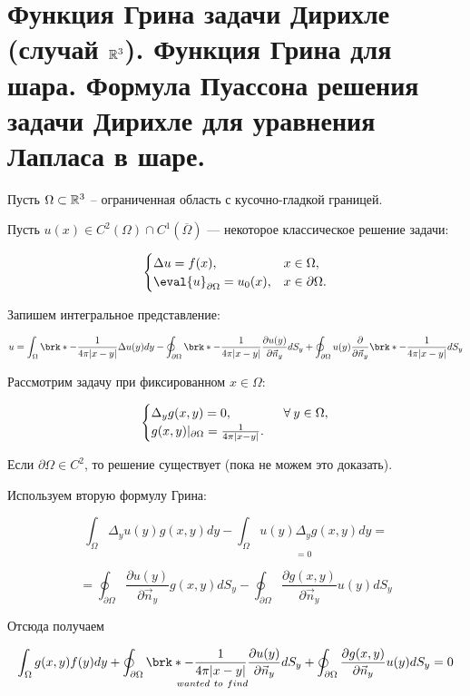 \section{Функция Грина задачи Дирихле (случай $\mathbb{R}^3$). Функция Грина для шара. Формула Пуассона решения задачи Дирихле для уравнения Лапласа в шаре.}

Пусть $\Omega \subset \mathbb{R}^3$ -- ограниченная область с кусочно-гладкой границей.

Пусть $u(x) \in C^2(\Omega) \cap C^1(\overline{\Omega})$ --- некоторое классическое решение задачи:

\[\begin{cases}
   \Delta u = f(x), & x\in \Omega, \\
   \eval{u}_{\partial \Omega} = u_0(x), & x \in \partial \Omega. 
\end{cases}\]  

Запишем интегральное представление:

$$ u = \int_{\Omega}{\brk*{-\frac{1}{4 \pi |x-y|}}  {\Delta u(y)} dy} - \oint_{\partial \Omega}{\brk*{-\frac{1}{4 \pi |x-y|}} \frac{\partial u(y)}{\partial \vec{n}_y} d S_y} + 
\oint_{\partial \Omega}{ {u(y)} \frac{\partial}{\partial \vec{n}_y}\brk*{-\frac{1}{4 \pi |x-y|}}d S_y}
$$

Рассмотрим задачу при фиксированном $x \in \Omega$:

\[\begin{cases}
   \Delta_y g(x,y) = 0, & \;\;\forall\: y \in \Omega, \\
   g(x,y)|_{\partial \Omega} = \frac{1}{4 \pi |x-y|}.
\end{cases}\] 

Если $\partial \Omega \in C^2$, то решение существует (пока не можем это доказать).

Используем вторую формулу Грина:

$$ \int_{\Omega}{\Delta_y u(y) g(x,y)dy} - 
{\underset{=0}{\int_{\Omega}{u(y) \Delta_y g(x,y) dy}}}=$$

$$=\oint_{\partial \Omega} {\frac{\partial u(y)}{\partial \vec{n}_y} g(x,y) dS_y} - \oint_{\partial \Omega} {\frac{\partial g(x,y)}{\partial \vec{n}_y} u(y) dS_y} $$

Отсюда получаем

$$\int_{\Omega}{g(x,y) f(y) dy} + \underset{wanted~to~find}{\oint_{\partial \Omega}{\brk*{-\frac{1}{4 \pi |x-y|}} \frac{\partial u(y)}{\partial \vec{n}_y} d S_y}}+ \oint_{\partial \Omega}
{\frac{\partial g(x,y)}{\partial \vec{n}_y}u(y) dS_y} = 0
$$


